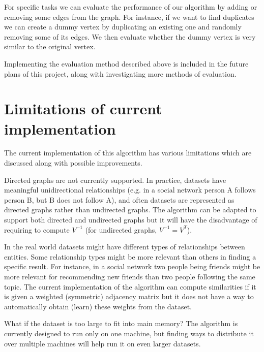 \documentclass[12pt]{report}
\begin{document}
For specific tasks we can evaluate the performance of our algorithm by adding or
removing some edges from the graph. For instance, if we want to find duplicates
we can create a dummy vertex by duplicating an existing one and randomly removing
some of its edges. We then evaluate whether the dummy vertex is very similar to
the original vertex.


Implementing the evaluation method described above is included in the future plans
of this project, along with investigating more methods of evaluation.


%
%
\section{Limitations of current implementation}
%
The current implementation of this algorithm has various limitations which are
discussed along with possible improvements.


Directed graphs are not currently supported. In practice, datasets have meaningful
unidirectional relationships (e.g. in a social network person A follows person B,
but B does not follow A), and often datasets are represented as directed graphs
rather than undirected graphs. The algorithm can be adapted to support both directed
and undirected graphs but it will have the disadvantage of requiring to compute
$V^{-1}$ (for undirected graphs, $V^{-1} = V^T$).


In the real world datasets might have different types of relationships between
entities. Some relationship types might be more relevant than others in finding
a specific result. For instance, in a social network two people being friends
might be more relevant for recommending new friends than two people following the
same topic. The current implementation of the algorithm can compute similarities
if it is given a weighted (symmetric) adjacency matrix but it does not have a
way to automatically obtain (learn) these weights from the dataset.


What if the dataset is too large to fit into main memory? The algorithm is
currently designed to run only on one machine, but finding ways to distribute it
over multiple machines will help run it on even larger datasets.

%
%
\end{document}
